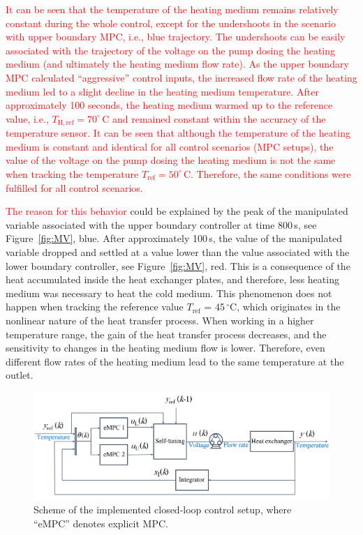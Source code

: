 \documentclass[preprint,12pt]{elsarticle}
\newcommand{\change}[1]{\textcolor{red}{#1}}
\begin{document}
\change{It can be seen that the temperature of the heating medium remains relatively constant during the whole control, except for the undershoots in the scenario with upper boundary MPC, i.e., blue trajectory. The undershoots can be easily associated with the trajectory of the voltage on the pump dosing the heating medium (and ultimately the heating medium flow rate). As the upper boundary MPC calculated ``aggressive'' control inputs, the increased flow rate of the heating medium led to a slight decline in the heating medium temperature. After approximately 100 seconds, the heating medium warmed up to the reference value, i.e., $T_{\mathrm{H, ref}} = 70^{\circ}$\,C and remained constant within the accuracy of the temperature sensor. It can be seen that although the temperature of the heating medium is constant and identical for all control scenarios (MPC setups), the value of the voltage on the pump dosing the heating medium is not the same when tracking the temperature $T_{\mathrm{ref}} = 50^{\circ}$\,C. Therefore, the same conditions were fulfilled for all control scenarios.} 

\change{The reason for this behavior} could be explained by the peak of the manipulated variable associated with the upper boundary controller at time 800\,s, see Figure~\ref{fig:MV}, blue. After approximately 100\,s, the value of the manipulated variable dropped and settled at a value lower than the value associated with the lower boundary controller, see Figure~\ref{fig:MV}, red. This is a consequence of the heat accumulated inside the heat exchanger plates, and therefore, less heating medium was necessary to heat the cold medium. This phenomenon does not happen when tracking the reference value $T_{\mathrm{ref}}$ = 45\,$^{\circ}\mathrm{C}$, which originates in the nonlinear nature of the heat transfer process. When working in a higher temperature range, the gain of the heat transfer process decreases, and the sensitivity to changes in the heating medium flow is lower. Therefore, even different flow rates of the heating medium lead to the same temperature at the outlet.

\begin{figure}
	\begin{center}
		\includegraphics[width=\textwidth]{images/cl3}
		\caption[Scheme of the implemented closed-loop control setup.]{Scheme of the implemented closed-loop control setup, where ``eMPC'' denotes explicit MPC.}
		\label{fig:CL}
	\end{center}
\end{figure}
\end{document}
